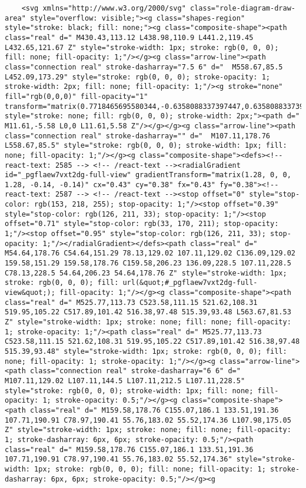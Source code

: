 \documentclass[
]{article}
\begin{document}
\begin{verbatim}
    <svg xmlns="http://www.w3.org/2000/svg" class="role-diagram-draw-area" style="overflow: visible;"><g class="shapes-region" style="stroke: black; fill: none;"><g class="composite-shape"><path class="real" d=" M430.43,113.12 L438.98,110.9 L441.2,119.45 L432.65,121.67 Z" style="stroke-width: 1px; stroke: rgb(0, 0, 0); fill: none; fill-opacity: 1;"/></g><g class="arrow-line"><path class="connection real" stroke-dasharray="7.5 6" d="  M558.67,85.5 L452.09,173.29" style="stroke: rgb(0, 0, 0); stroke-opacity: 1; stroke-width: 2px; fill: none; fill-opacity: 1;"/><g stroke="none" fill="rgb(0,0,0)" fill-opacity="1" transform="matrix(0.7718465695580344,-0.6358088337397447,0.6358088337397447,0.7718465695580344,449,175.83332824707028)" style="stroke: none; fill: rgb(0, 0, 0); stroke-width: 2px;"><path d=" M11.61,-5.58 L0,0 L11.61,5.58 Z"/></g></g><g class="arrow-line"><path class="connection real" stroke-dasharray="" d="  M107.11,178.76 L558.67,85.5" style="stroke: rgb(0, 0, 0); stroke-width: 1px; fill: none; fill-opacity: 1;"/></g><g class="composite-shape"><defs><!-- react-text: 2585 --> <!-- /react-text --><radialGradient id="_pgflaew7vxt2dg-full-view" gradientTransform="matrix(1.28, 0, 0, 1.28, -0.14, -0.14)" cx="0.43" cy="0.38" fx="0.43" fy="0.38"><!-- react-text: 2587 --> <!-- /react-text --><stop offset="0" style="stop-color: rgb(153, 218, 255); stop-opacity: 1;"/><stop offset="0.39" style="stop-color: rgb(126, 211, 33); stop-opacity: 1;"/><stop offset="0.71" style="stop-color: rgb(33, 170, 211); stop-opacity: 1;"/><stop offset="0.95" style="stop-color: rgb(126, 211, 33); stop-opacity: 1;"/></radialGradient></defs><path class="real" d=" M54.64,178.76 C54.64,151.29 78.13,129.02 107.11,129.02 C136.09,129.02 159.58,151.29 159.58,178.76 C159.58,206.23 136.09,228.5 107.11,228.5 C78.13,228.5 54.64,206.23 54.64,178.76 Z" style="stroke-width: 1px; stroke: rgb(0, 0, 0); fill: url(&quot;#_pgflaew7vxt2dg-full-view&quot;); fill-opacity: 1;"/></g><g class="composite-shape"><path class="real" d=" M525.77,113.73 C523.58,111.15 521.62,108.31 519.95,105.22 C517.89,101.42 516.38,97.48 515.39,93.48 L563.67,81.53 Z" style="stroke-width: 1px; stroke: none; fill: none; fill-opacity: 1; stroke-opacity: 1;"/><path class="real" d=" M525.77,113.73 C523.58,111.15 521.62,108.31 519.95,105.22 C517.89,101.42 516.38,97.48 515.39,93.48" style="stroke-width: 1px; stroke: rgb(0, 0, 0); fill: none; fill-opacity: 1; stroke-opacity: 1;"/></g><g class="arrow-line"><path class="connection real" stroke-dasharray="6 6" d="  M107.11,129.02 L107.11,144.5 L107.11,212.5 L107.11,228.5" style="stroke: rgb(0, 0, 0); stroke-width: 1px; fill: none; fill-opacity: 1; stroke-opacity: 0.5;"/></g><g class="composite-shape"><path class="real" d=" M159.58,178.76 C155.07,186.1 133.51,191.36 107.71,190.91 C78.97,190.41 55.76,183.02 55.52,174.36 L107.98,175.05 Z" style="stroke-width: 1px; stroke: none; fill: none; fill-opacity: 1; stroke-dasharray: 6px, 6px; stroke-opacity: 0.5;"/><path class="real" d=" M159.58,178.76 C155.07,186.1 133.51,191.36 107.71,190.91 C78.97,190.41 55.76,183.02 55.52,174.36" style="stroke-width: 1px; stroke: rgb(0, 0, 0); fill: none; fill-opacity: 1; stroke-dasharray: 6px, 6px; stroke-opacity: 0.5;"/></g><g 
\end{verbatim}
\end{document}
